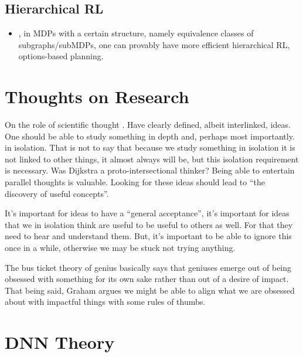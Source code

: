 \subsection{Hierarchical RL}
\begin{itemize}
  \item \citet{wen2020efficiency}, in MDPs with a certain structure, namely equivalence classes of subgraphs/subMDPs, one can provably have more efficient hierarchical RL, options-based planning.
\end{itemize}
    


\section{Thoughts on Research}

On the role of scientific thought \cite{dijkstra1974role}. Have clearly defined, albeit interlinked, ideas. One should be able to study something in depth and, perhaps most importantly. in isolation. That is not to say that because we study something in isolation it is not linked to other things, it almost always will be, but this isolation requirement is necessary. Was Dijkstra a proto-intersectional thinker? Being able to entertain parallel thoughts is valuable. Looking for these ideas should lead to ``the discovery of useful concepts''.

It's important for ideas to have a ``general acceptance'', it's important for ideas that we in isolation think are useful to be useful to others as well. For that they need to hear and understand them. But, it's important to be able to ignore this once in a while, otherwise we may be stuck not trying anything.

The bus ticket theory of genius \cite{graham2019busticket} basically says that geniuses emerge out of being obsessed with something for its own sake rather than out of a desire of impact. That being said, Graham argues we might be able to align what we are obsessed about with impactful things with some rules of thumbs.

\section{DNN Theory}



